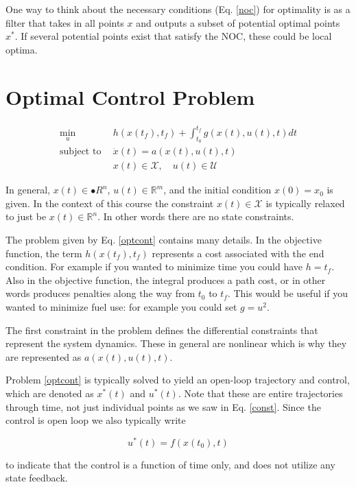 \documentclass[twoside]{article}
\begin{document}
One way to think about the necessary conditions (Eq. \ref{noc}) for optimality is as a filter that takes in all points $x$ and outputs a subset of potential optimal points $x^*$. If several potential points exist that satisfy the NOC, these could be local optima.

\section{Optimal Control Problem}

\begin{equation} \label{optcont}
\begin{split}
\underset{u}{\text{min}} \:\: &h(x(t_f),t_f) + \int_{t_0}^{t_f} g(x(t),u(t),t) dt \\
\text{subject to} \:\: &\dot{x}(t) = a(x(t),u(t),t) \\
&x(t) \in \mathcal{X}, \quad u(t) \in \mathcal{U}
\end{split}
\end{equation}

In general, $x(t) \in \mathbb{•}{R}^n$, $u(t) \in \mathbb{R}^m$, and the initial condition $x(0) = x_0$ is given. In the context of this course the constraint $x(t) \in \mathcal{X}$ is typically relaxed to just be $x(t) \in \mathbb{R}^n$. In other words there are no state constraints.

The problem given by Eq. \ref{optcont} contains many details. In the objective function, the term $h(x(t_f),t_f)$ represents a cost associated with the end condition. For example if you wanted to minimize time you could have $h = t_f$. Also in the objective function, the integral produces a path cost, or in other words produces penalties along the way from $t_0$ to $t_f$. This would be useful if you wanted to minimize fuel use: for example you could set $g = u^2$.

The first constraint in the problem defines the differential constraints that represent the system dynamics. These in general are nonlinear which is why they are represented as $a(x(t),u(t),t)$.

Problem \ref{optcont} is typically solved to yield an open-loop trajectory and control, which are denoted as $x^*(t)$ and $u^*(t)$. Note that these are entire trajectories through time, not just individual points as we saw in Eq. \ref{const}. Since the control is open loop we also typically write

$$u^*(t) = f(x(t_0),t)$$

to indicate that the control is a function of time only, and does not utilize any state feedback.
\end{document}
